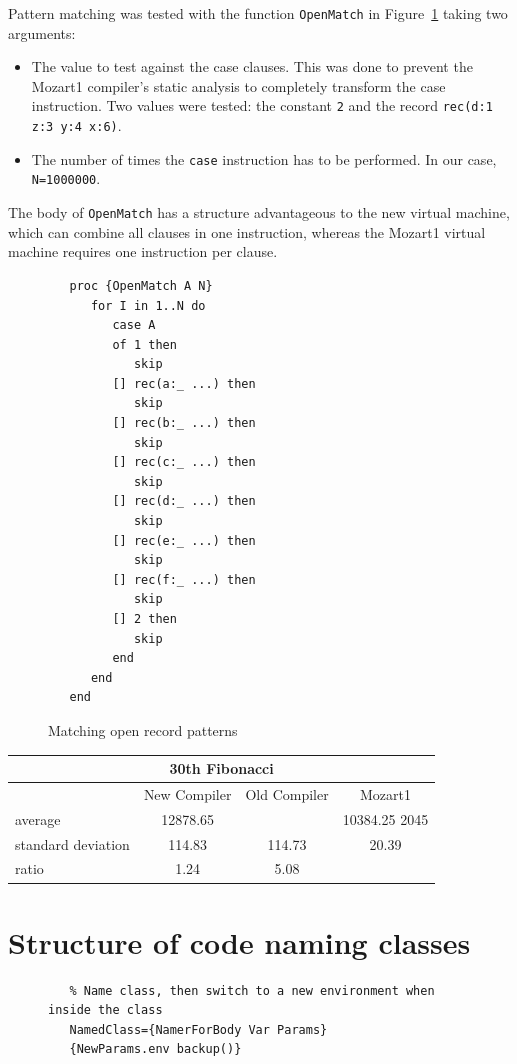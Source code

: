 \documentclass[a4paper]{memoir}
\begin{document}
\begin{appendices}
Pattern matching was tested with the function \lstinline!OpenMatch! in Figure~\ref{fig:perfs:openmatch} taking two
arguments:
\begin{itemize}
  \item The value to test against the case clauses. This was done to prevent the
    Mozart1 compiler's static analysis to completely transform the case
    instruction. Two values were tested: the constant \lstinline!2! and the
    record \lstinline!rec(d:1 z:3 y:4 x:6)!. 
  \item The number of times the \lstinline!case! instruction has to be
    performed. In our case, \lstinline!N=1000000!.
\end{itemize} 
The body of \lstinline!OpenMatch! has a structure advantageous to the new
virtual machine, which can combine all clauses in one instruction, whereas the
Mozart1 virtual machine requires one instruction per clause.

\begin{figure}[h]
\begin{lstlisting}
   proc {OpenMatch A N}
      for I in 1..N do
         case A
         of 1 then
            skip
         [] rec(a:_ ...) then
            skip
         [] rec(b:_ ...) then
            skip
         [] rec(c:_ ...) then
            skip
         [] rec(d:_ ...) then
            skip
         [] rec(e:_ ...) then
            skip
         [] rec(f:_ ...) then
            skip
         [] 2 then
            skip
         end
      end
   end
\end{lstlisting}
\caption{Matching open record patterns}
\label{fig:perfs:openmatch}
\end{figure}


\begin{center}
\begin{tabular} {| l c c c|}
\hline
\multicolumn{4}{|c|}{\textbf{30th Fibonacci}} \\ \hline
  & New Compiler& Old Compiler & Mozart1 \\
average&12878.65&&10384.25  2045 \\
standard deviation&114.83& 114.73& 20.39 \\
ratio&1.24& 5.08  & \\

\hline
\end{tabular}
\end{center}

\chapter{Structure of code naming classes}\label{appendix:classnamer}
\begin{figure}[H]
\begin{lstlisting}
   % Name class, then switch to a new environment when inside the class
   NamedClass={NamerForBody Var Params}
   {NewParams.env backup()}


\end{lstlisting}
\end{figure}
\end{appendices}
\end{document}
